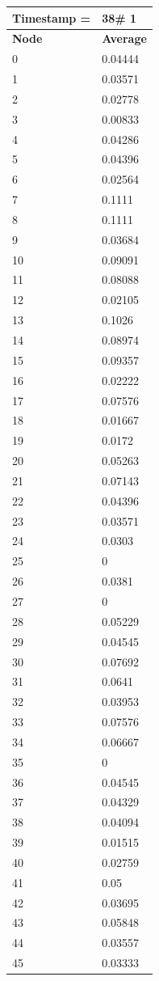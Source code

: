 \begin{tabular}{|l||l|}
\hline
\textbf{Timestamp =} & \textbf{38}\# 1\\\hline
	\textbf{Node} & \textbf{Average} \\ \hline
\hline
	0 & 0.04444 \\ \hline
	1 & 0.03571 \\ \hline
	2 & 0.02778 \\ \hline
	3 & 0.00833 \\ \hline
	4 & 0.04286 \\ \hline
	5 & 0.04396 \\ \hline
	6 & 0.02564 \\ \hline
	7 & 0.1111 \\ \hline
	8 & 0.1111 \\ \hline
	9 & 0.03684 \\ \hline
	10 & 0.09091 \\ \hline
	11 & 0.08088 \\ \hline
	12 & 0.02105 \\ \hline
	13 & 0.1026 \\ \hline
	14 & 0.08974 \\ \hline
	15 & 0.09357 \\ \hline
	16 & 0.02222 \\ \hline
	17 & 0.07576 \\ \hline
	18 & 0.01667 \\ \hline
	19 & 0.0172 \\ \hline
	20 & 0.05263 \\ \hline
	21 & 0.07143 \\ \hline
	22 & 0.04396 \\ \hline
	23 & 0.03571 \\ \hline
	24 & 0.0303 \\ \hline
	25 & 0 \\ \hline
	26 & 0.0381 \\ \hline
	27 & 0 \\ \hline
	28 & 0.05229 \\ \hline
	29 & 0.04545 \\ \hline
	30 & 0.07692 \\ \hline
	31 & 0.0641 \\ \hline
	32 & 0.03953 \\ \hline
	33 & 0.07576 \\ \hline
	34 & 0.06667 \\ \hline
	35 & 0 \\ \hline
	36 & 0.04545 \\ \hline
	37 & 0.04329 \\ \hline
	38 & 0.04094 \\ \hline
	39 & 0.01515 \\ \hline
	40 & 0.02759 \\ \hline
	41 & 0.05 \\ \hline
	42 & 0.03695 \\ \hline
	43 & 0.05848 \\ \hline
	44 & 0.03557 \\ \hline
	45 & 0.03333 \\ \hline
\end{tabular}
